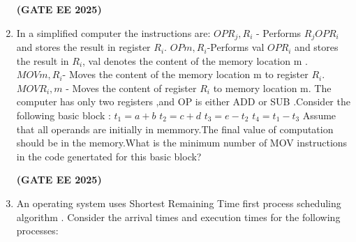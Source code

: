 \documentclass[journal,12pt,onecolumn]{IEEEtran}
\theoremstyle{remark}
\begin{document}
\begin{enumerate}
\begin{enumerate}
\begin{multicols}{2}
       \end{multicols}
    \end{enumerate}
    \hfill \textbf{(GATE EE 2025)}
    \item In a simplified computer  the instructions are:
    \newline 
    $OPR_j,R_i$ - Performs $R_jOPR_i$ and stores the result in register $R_i$.
    \newline
    $OPm,R_i$-Performs val $OPR_i$ and stores the result in $R_i$, val denotes the content of the memory location m .
    \newline
    $MOV m,R_i$- Moves the content of the memory location m to register $R_i$.
    \newline 
    $MOV R_i,m$ - Moves the content of register $R_i$ to memory location m.
    \newline
    The computer has only two registers ,and OP is either ADD or SUB .Consider the following basic block :
    \newline
     $t_1 =a+b $
     \newline 
     $t_2= c+d$
     \newline 
     $t_3=e-t_2$
     \newline
     $t_4=t_1-t_3$
     \newline 
     Assume that all operands are initially in memmory.The final value of computation should  be in the memory.What is the minimum number of MOV instructions in the code genertated for this basic block?
     \begin{enumerate}
     \end{enumerate}
     \hfill \textbf{(GATE EE 2025)}
     \item An operating system uses Shortest Remaining Time first  process scheduling algorithm . Consider the arrival times and execution times for the following processes:
     \newline
     \begin{tabular}{c c c}
          
     
     

\end{tabular}
\end{enumerate}
\end{document}
